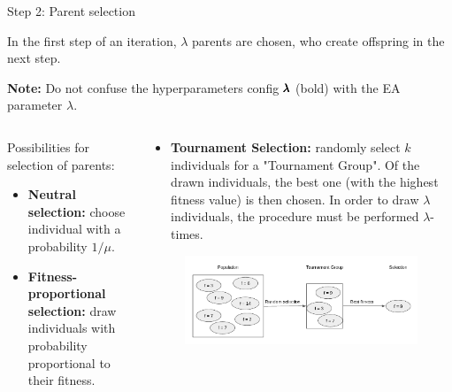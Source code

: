 \begin{frame}{Step 2: Parent selection}


In the first step of an iteration, $\lambda$ parents are chosen, who create offspring in the next step.

\begin{footnotesize}
    \textbf{Note:} Do not confuse the hyperparameters config $\pmb{\lambda}$ (bold) with the EA parameter $\lambda$.
\end{footnotesize}

\begin{columns}
\begin{column}{0.5\textwidth}

  Possibilities for selection of parents:

  \begin{itemize}
    \item \textbf{Neutral selection: }choose individual with a probability $1/\mu$.
    \item \textbf{Fitness-proportional selection: }draw individuals with probability proportional to their fitness.
  \end{itemize}
\end{column}%
\begin{column}{0.5\textwidth}
  \begin{itemize}
    \item \textbf{Tournament Selection: }randomly select $k$ individuals for a "Tournament Group". Of the drawn individuals, the best one (with the highest fitness value) is then chosen. In order to draw $\lambda$ individuals, the procedure must be performed $\lambda$-times.
  \end{itemize}

  \begin{figure}
    \includegraphics[width = 0.9\linewidth]{images/tournament_selection.png}
  \end{figure}

\end{column}
\end{columns}


\end{frame}

